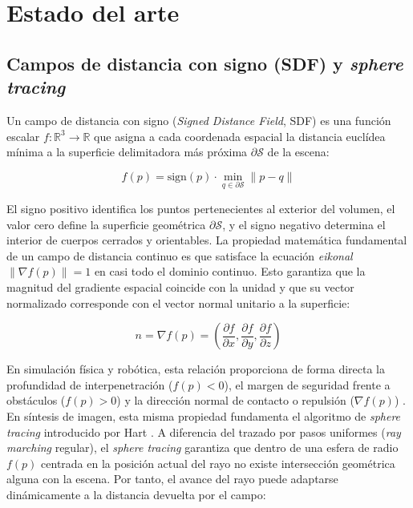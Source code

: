 \clearpage
\section{Estado del arte}

\subsection{Campos de distancia con signo (SDF) y \textit{sphere tracing}}

Un campo de distancia con signo (\textit{Signed Distance Field}, SDF) es una función escalar $f: \mathbb{R}^3 \to \mathbb{R}$ que asigna a cada coordenada espacial la distancia euclídea mínima a la superficie delimitadora más próxima $\partial \mathcal{S}$ de la escena:

\begin{equation}
  f(p) = \text{sign}(p) \cdot \min_{q \in \partial \mathcal{S}} \|p - q\|
\end{equation}

El signo positivo identifica los puntos pertenecientes al exterior del volumen, el valor cero define la superficie geométrica $\partial \mathcal{S}$, y el signo negativo determina el interior de cuerpos cerrados y orientables. La propiedad matemática fundamental de un campo de distancia continuo es que satisface la ecuación \textit{eikonal} $\|\nabla f(p)\| = 1$ en casi todo el dominio continuo. Esto garantiza que la magnitud del gradiente espacial coincide con la unidad y que su vector normalizado corresponde con el vector normal unitario a la superficie:

\begin{equation}
  n = \nabla f(p) = \left( \frac{\partial f}{\partial x}, \frac{\partial f}{\partial y}, \frac{\partial f}{\partial z} \right)
\end{equation}

En simulación física y robótica, esta relación proporciona de forma directa la profundidad de interpenetración ($f(p) < 0$), el margen de seguridad frente a obstáculos ($f(p) > 0$) y la dirección normal de contacto o repulsión ($\nabla f(p)$) \cite{macklin2020, oleynikova2017}. En síntesis de imagen, esta misma propiedad fundamenta el algoritmo de \textit{sphere tracing} introducido por Hart \cite{hart1996}. A diferencia del trazado por pasos uniformes (\textit{ray marching} regular), el \textit{sphere tracing} garantiza que dentro de una esfera de radio $f(p)$ centrada en la posición actual del rayo no existe intersección geométrica alguna con la escena. Por tanto, el avance del rayo puede adaptarse dinámicamente a la distancia devuelta por el campo:

